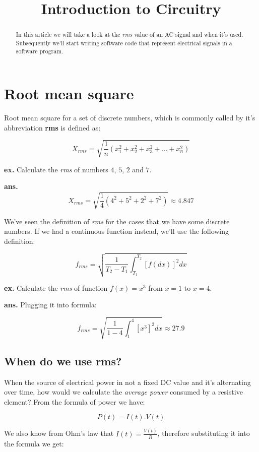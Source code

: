 \documentclass{article}
\begin{document}
	
	\title{Introduction to Circuitry}
	\author{}
	
	\maketitle
	
	\begin{abstract}
	In this article we will take a look at the \textit{rms} value of an AC signal and when it's used. Subsequently we'll start writing software code that represent electrical signals in a software program.

	\end{abstract}
	
	\section{Root mean square}
	Root mean square for a set of discrete numbers, which is commonly called by it's abbreviation \textbf{rms} is defined as:
	
	$$ X_{rms} = \sqrt{\frac{1}{n}(x_1^2 + x_2^2 + x_3^2 + ... + x_n^2 )} $$

	\textbf{ex.} Calculate the \textit{rms} of numbers $4$, $5$, $2$ and $7$.
	
	\textbf{ans.} $$ X_{rms} = \sqrt{\frac{1}{4}(4^2 + 5^2 + 2^2 + 7^2)} \approx 4.847 $$
	
	We've seen the definition of \textit{rms} for the cases that we have some discrete numbers. If we had a continuous function instead, we'll use the following definition:
	
	$$ f_{rms} = \sqrt{\frac{1}{T_2 - T_1} \int_{T_1}^{T_2} [f(dx)]^2 dx } $$
	
	\textbf{ex.} Calculate the \textit{rms} of function $f(x) = x^3$ from $x = 1$ to $x = 4$.
	
	\textbf{ans.} Plugging it into formula:
	
	$$ f_{rms} = \sqrt{\frac{1}{1 - 4} \int_{1}^{4} [x^3]^2 dx } \approx 27.9 $$

	\subsection{When do we use rms?}
	When the source of electrical power in not a fixed DC value and it's alternating over time, how would we calculate the \textit{average power} consumed by a resistive element? From the formula of power we have:
	
	$$P(t) = I(t).V(t)$$

	We also know from Ohm's law that $I(t) = \frac{V(t)}{R}$, therefore substituting it into the formula we get:
	
\end{document}
